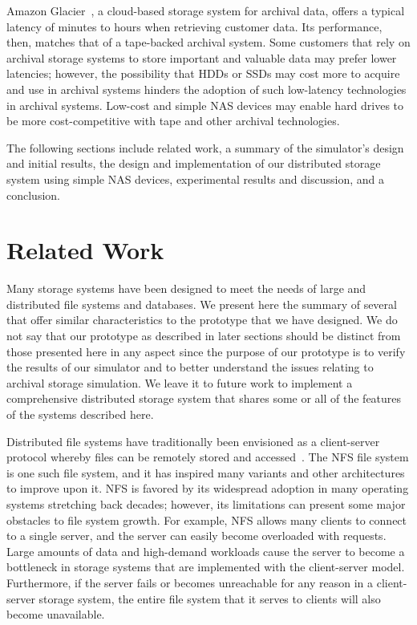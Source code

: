 Amazon Glacier~\cite{web6}, a cloud-based storage system for archival data, offers a typical latency of minutes to hours when retrieving customer data.  Its performance, then, matches that of a tape-backed archival system.  Some customers that rely on archival storage systems to store important and valuable data may prefer lower latencies; however, the possibility that HDDs or SSDs may cost more to acquire and use in archival systems hinders the adoption of such low-latency technologies in archival systems.  Low-cost and simple NAS devices may enable hard drives to be more cost-competitive with tape and other archival technologies.

The following sections include related work, a summary of the simulator's design and initial results, the design and implementation of our distributed storage system using simple NAS devices, experimental results and discussion, and a conclusion.



\section{Related Work}
Many storage systems have been designed to meet the needs of large and distributed file systems and databases.  We present here the summary of several that offer similar characteristics to the prototype that we have designed.  We do not say that our prototype as described in later sections should be distinct from those presented here in any aspect since the purpose of our prototype is to verify the results of our simulator and to better understand the issues relating to archival storage simulation.  We leave it to future work to implement a comprehensive distributed storage system that shares some or all of the features of the systems described here.

Distributed file systems have traditionally been envisioned as a client-server protocol whereby files can be remotely stored and accessed~\cite{Sandberg85designand}.  The NFS file system is one such file system, and it has inspired many variants and other architectures to improve upon it.  NFS is favored by its widespread adoption in many operating systems stretching back decades; however, its limitations can present some major obstacles to file system growth.  For example, NFS allows many clients to connect to a single server, and the server can easily become overloaded with requests.  Large amounts of data and high-demand workloads cause the server to become a bottleneck in storage systems that are implemented with the client-server model.  Furthermore, if the server fails or becomes unreachable for any reason in a client-server storage system, the entire file system that it serves to clients will also become unavailable.

